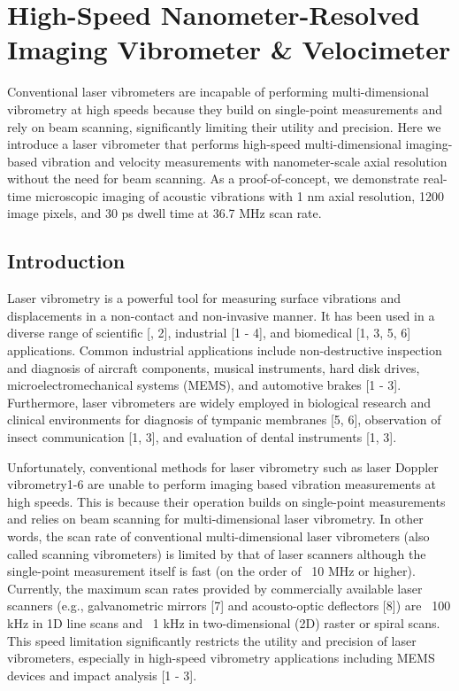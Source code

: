 \chapter{High-Speed Nanometer-Resolved Imaging Vibrometer \& Velocimeter}

Conventional laser vibrometers are incapable of performing multi-dimensional vibrometry at high speeds because they build on single-point measurements and rely on beam scanning, significantly limiting their utility and precision. Here we introduce a laser vibrometer that performs high-speed multi-dimensional imaging-based vibration and velocity measurements with nanometer-scale axial resolution without the need for beam scanning. As a proof-of-concept, we demonstrate real-time microscopic imaging of acoustic vibrations with 1 nm axial resolution, 1200 image pixels, and 30 ps dwell time at 36.7 MHz scan rate.

\section{Introduction}

Laser vibrometry is a powerful tool for measuring surface vibrations and displacements in a non-contact and non-invasive manner. It has been used in a diverse range of scientific \cite{castellini2006laser} [, 2], industrial [1 - 4], and biomedical [1, 3, 5, 6] applications. Common industrial applications include non-destructive inspection and diagnosis of aircraft components, musical instruments, hard disk drives, microelectromechanical systems (MEMS), and automotive brakes [1 - 3]. Furthermore, laser vibrometers are widely employed in biological research and clinical environments for diagnosis of tympanic membranes [5, 6], observation of insect communication [1, 3], and evaluation of dental instruments [1, 3].

Unfortunately, conventional methods for laser vibrometry such as laser Doppler vibrometry1-6 are unable to perform imaging based vibration measurements at high speeds. This is because their operation builds on single-point measurements and relies on beam scanning for multi-dimensional laser vibrometry. In other words, the scan rate of conventional multi-dimensional laser vibrometers (also called scanning vibrometers) is limited by that of laser scanners although the single-point measurement itself is fast (on the order of ~10 MHz or higher). Currently, the maximum scan rates provided by commercially available laser scanners (e.g., galvanometric mirrors [7] and acousto-optic deflectors [8]) are ~100 kHz in 1D line scans and ~1 kHz in two-dimensional (2D) raster or spiral scans. This speed limitation significantly restricts the utility and precision of laser vibrometers, especially in high-speed vibrometry applications including MEMS devices and impact analysis [1 - 3].

